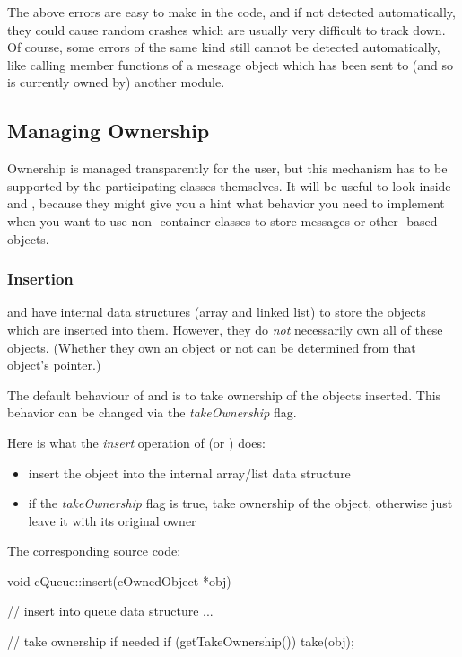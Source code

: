 The above errors are easy to make in the code, and if not detected
automatically, they could cause random crashes which are usually very
difficult to track down. Of course, some errors of the same kind still
cannot be detected automatically, like calling member functions of a
message object which has been sent to (and so is currently owned by) another
module.


\subsection{Managing Ownership}
\label{sec:sim-lib:managing-ownership}

Ownership is managed transparently for the user, but this mechanism
has to be supported by the participating classes themselves.
It will be useful to look inside  and ,
because they might give you a hint what behavior you need
to implement when you want to use non-{\opp} container classes
to store messages or other -based objects.


\subsubsection{Insertion}
\label{sec:sim-lib:ownership-and-insertion-into-container}

 and  have internal data structures
(array and linked list) to store the objects which are inserted
into them. However, they do \textit{not} necessarily own all of these
objects.  (Whether they own an object or not can be determined
from that object's  pointer.)

The default behaviour of  and  is
to take ownership of the objects inserted.
This behavior can be changed via the \textit{takeOwnership} flag.

Here is what the \textit{insert} operation of  (or ) does:
\begin{itemize}
    \item insert the object into the internal array/list data structure

    \item if the \textit{takeOwnership} flag is true, take ownership
    of the object, otherwise just leave it with its original owner
\end{itemize}

The corresponding source code:

\begin{cpp}
void cQueue::insert(cOwnedObject *obj)
{
    // insert into queue data structure
    ...

    // take ownership if needed
    if (getTakeOwnership())
        take(obj);

}
\end{cpp}


